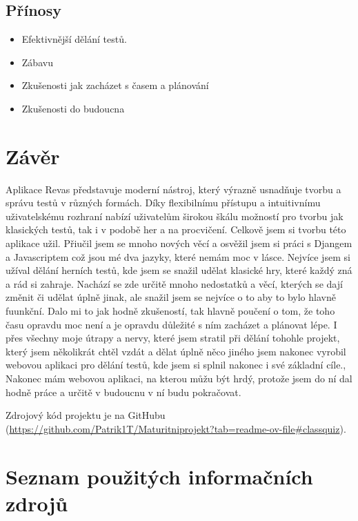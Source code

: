 \documentclass[12pt, a4paper, twoside, openright]{report}
\begin{document}
	\section{Přínosy}

	\begin{itemize}
	\item Efektivnější dělání testů.
        \item Zábavu
        \item Zkušenosti jak zacházet s časem a plánování
        \item Zkušenosti do budoucna
		
	\end{itemize}

    

\chapter{Závěr}
	Aplikace Revas představuje moderní nástroj, který výrazně usnadňuje tvorbu a správu testů v různých formách. Díky flexibilnímu přístupu a intuitivnímu uživatelskému rozhraní nabízí uživatelům širokou škálu možností pro tvorbu jak klasických testů, tak i v podobě her a na procvičení. Celkově jsem si tvorbu této aplikace užil. Přiučil jsem se mnoho nových věcí a osvěžil jsem si práci s Djangem a Javascriptem což jsou mé dva jazyky, které nemám moc v lásce. Nejvíce jsem si užíval dělání herních testů, kde jsem se snažil udělat klasické hry, které každý zná a rád si zahraje. Nachází se zde určitě mnoho nedostatků a věcí, kterých se dají změnit či udělat úplně jinak, ale snažil jsem se nejvíce o to aby to bylo hlavně fuunkční. Dalo mi to jak hodně zkušeností, tak hlavně poučení o tom, že toho času opravdu moc není a je opravdu důležité s ním zacházet a plánovat lépe. I přes všechny moje útrapy a nervy, které jsem stratil při dělání tohohle projekt, který jsem několikrát chtěl vzdát a dělat úplně něco jiného jsem nakonec vyrobil webovou aplikaci pro dělání testů, kde jsem si splnil nakonec i své základní cíle., Nakonec mám webovou aplikaci, na kterou můžu být hrdý, protože jsem do ní dal hodně práce a určitě v budoucnu v ní budu pokračovat.

	Zdrojový kód projektu je na GitHubu (\url{https://github.com/Patrik1T/Maturitniprojekt?tab=readme-ov-file#classquiz}).

\chapter*{Seznam použitých informačních zdrojů}
\end{document}
